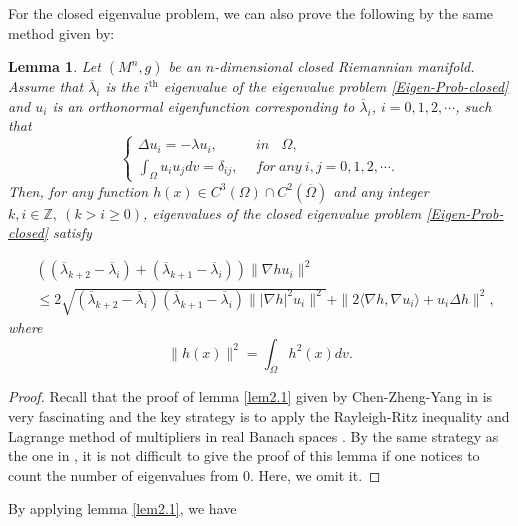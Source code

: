 \documentclass[12pt]{article}
\newtheorem{lem}[thm]{Lemma}
\numberwithin{equation}{section}
\begin{document}
For the closed eigenvalue problem, we can also prove the following by the same method given by:

\begin{lem}\label{lem2.2}
Let $(M^{n},g)$ be an $n$-dimensional closed Riemannian manifold.
Assume that $\overline{\lambda}_{i}$  is  the $i^{\text{th}}$ eigenvalue of the
eigenvalue problem \eqref{Eigen-Prob-closed}  and $u_{i}$ is an
orthonormal eigenfunction corresponding to $\overline{\lambda}_{i}$, $i =0,
1,2,\cdots$, such that
\begin{equation*}
\left\{ \begin{aligned}\Delta u_{i}=-\lambda u_{i},\ \ \ \ \ \ \ &
in\ \ \ \ \Omega,
\\
\int_{\Omega}
u_{i}u_{j}dv=\delta_{ij},\ \ & for~any  \ i,j=0,1,2,\cdots.
                          \end{aligned} \right.
                          \end{equation*}
Then, for any function $h(x)\in C^{3}(\Omega)\cap C^{2}(\overline{\Omega})$ and any
integer $k,i \in \mathbb{Z},~(k>i\geq0)$,  eigenvalues of the closed eigenvalue problem \eqref{Eigen-Prob-closed} satisfy


\begin{equation}\begin{aligned}\label{general-formula-1}&((\overline{\lambda}_{k+2}-\overline{\lambda}_{i})+(\overline{\lambda}_{k+1}-\overline{\lambda}_{i}))\|\nabla hu_{i}\|^{2}
\\&\leq2\sqrt{(\overline{\lambda}_{k+2}-\overline{\lambda}_{i})(\overline{\lambda}_{k+1}-\overline{\lambda}_{i})\||\nabla h|^{2}u_{i}\|^{2}}
+\|2\langle\nabla h,\nabla u_{i}\rangle+u_{i}\Delta h\|^{2},
\end{aligned}\end{equation}
where
\begin{equation*}
\|h(x)\|^{2} =\int_{\Omega}h^{2}(x)dv.
\end{equation*}
\end{lem}
\begin{proof}Recall that the proof of lemma \ref{lem2.1} given by Chen-Zheng-Yang in \cite{CZY} is very fascinating
and the key strategy is to apply the Rayleigh-Ritz inequality and Lagrange method of multipliers in real Banach spaces .
By the same strategy as the one in \cite{CZY}, it is not difficult to give the proof of this lemma if one notices to count the number of eigenvalues from $0$.
Here, we omit it.\end{proof}
By applying lemma \ref{lem2.1}, we have
\end{document}
